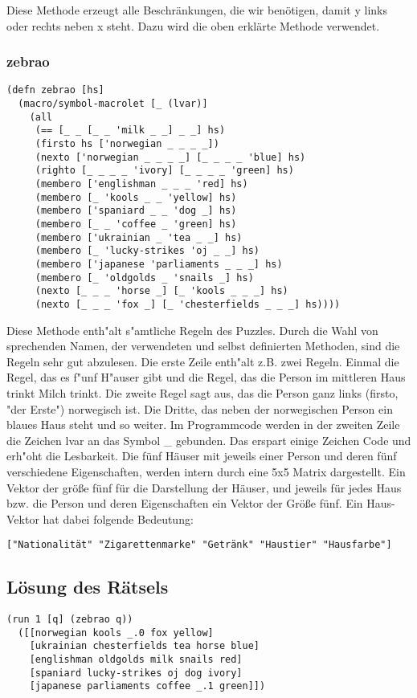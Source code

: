 Diese Methode erzeugt alle Beschränkungen, die wir benötigen, damit \dq{}y\dq{} links oder rechts neben \dq{}x\dq{} steht. Dazu wird die oben erklärte Methode  verwendet.

\subsubsection{zebrao}

\begin{lstlisting}
(defn zebrao [hs]
  (macro/symbol-macrolet [_ (lvar)]
    (all
     (== [_ _ [_ _ 'milk _ _] _ _] hs)
     (firsto hs ['norwegian _ _ _ _])
     (nexto ['norwegian _ _ _ _] [_ _ _ _ 'blue] hs)
     (righto [_ _ _ _ 'ivory] [_ _ _ _ 'green] hs)
     (membero ['englishman _ _ _ 'red] hs)
     (membero [_ 'kools _ _ 'yellow] hs)
     (membero ['spaniard _ _ 'dog _] hs)
     (membero [_ _ 'coffee _ 'green] hs)
     (membero ['ukrainian _ 'tea _ _] hs)
     (membero [_ 'lucky-strikes 'oj _ _] hs)
     (membero ['japanese 'parliaments _ _ _] hs)
     (membero [_ 'oldgolds _ 'snails _] hs)
     (nexto [_ _ _ 'horse _] [_ 'kools _ _ _] hs)
     (nexto [_ _ _ 'fox _] [_ 'chesterfields _ _ _] hs))))
\end{lstlisting}

Diese Methode enth"alt s"amtliche Regeln des Puzzles. Durch die Wahl von sprechenden Namen, der verwendeten und selbst definierten Methoden, sind die Regeln sehr gut abzulesen. Die erste Zeile enth"alt z.B. zwei Regeln. Einmal die Regel, das es f"unf H"auser gibt und die Regel, das die Person im mittleren Haus trinkt Milch trinkt. Die zweite Regel sagt aus, das die Person ganz links (firsto, "der Erste") norwegisch ist. Die Dritte, das neben der norwegischen Person ein blaues Haus steht und so weiter.
Im Programmcode werden in der zweiten Zeile die Zeichen \dq{}lvar\dq{} an das Symbol \dq{}\_\dq{} gebunden. Das erspart einige Zeichen Code und erh"oht die Lesbarkeit. 
Die fünf Häuser mit jeweils einer Person und deren fünf verschiedene Eigenschaften, werden intern durch eine 5x5 Matrix dargestellt. Ein Vektor der größe fünf für die Darstellung der Häuser, und jeweils für jedes Haus bzw. die Person und deren Eigenschaften ein Vektor der Größe fünf. Ein \dq{}Haus-Vektor\dq{} hat dabei folgende Bedeutung:

\begin{lstlisting}
["Nationalität" "Zigarettenmarke" "Getränk" "Haustier" "Hausfarbe"]
\end{lstlisting}

\subsection{Lösung des Rätsels}

\begin{lstlisting}
(run 1 [q] (zebrao q))
  ([[norwegian kools _.0 fox yellow]
    [ukrainian chesterfields tea horse blue]
    [englishman oldgolds milk snails red]
    [spaniard lucky-strikes oj dog ivory]
    [japanese parliaments coffee _.1 green]])
\end{lstlisting}